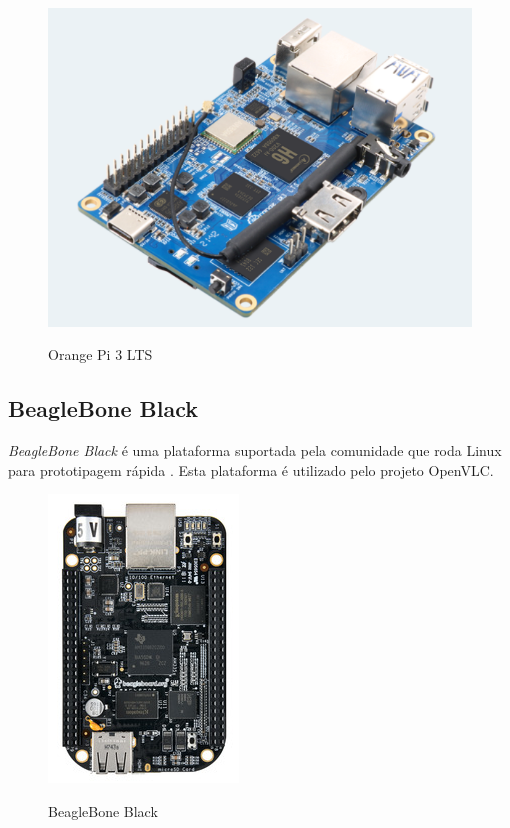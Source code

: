 \begin{figure}[!htbp]
  \caption{Orange Pi 3 LTS}
  \includegraphics[scale=0.4]{images/orange.png}
  \label{figura:orange}
\end{figure}

\subsection{BeagleBone Black}

\textit{BeagleBone Black} é uma plataforma suportada pela comunidade que roda Linux para prototipagem rápida \cite{beaglebone}.
Esta plataforma é utilizado pelo projeto OpenVLC.

\begin{figure}[!htbp]
  \caption{BeagleBone Black}
  \includegraphics[scale=0.6]{images/beaglebone.png}
  \label{figura:beagle}
\end{figure}

